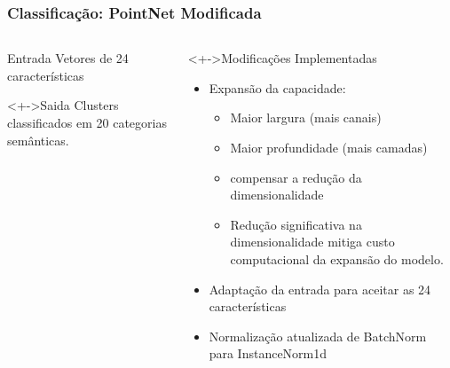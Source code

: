 \documentclass[aspectratio=169,t,xcolor=table]{beamer}
\begin{document}
\begin{frame}
    \frametitle{Classificação: PointNet Modificada}
    \begin{columns}[T]
        \begin{column}{.4\textwidth}
            \begin{block}{Entrada}
                \vspace{0.5em}
                Vetores de 24 características
                \vspace{0.5em}
            \end{block}
            \begin{block}<+->{Saida}
                \vspace{0.5em}
                Clusters classificados em 20 categorias semânticas.
                \vspace{0.5em}
            \end{block}
        \end{column}
        \begin{column}{.6\textwidth}
            \begin{block}<+->{Modificações Implementadas}
                \begin{itemize}[<+->]
                    \item Expansão da capacidade:
                          \begin{itemize}
                              \item Maior largura (mais canais)
                              \item Maior profundidade (mais camadas)
                              \item compensar a redução da dimensionalidade
                              \item Redução significativa na dimensionalidade
                                    mitiga custo computacional da expansão do
                                    modelo.
                          \end{itemize}
                    \item Adaptação da entrada para aceitar as 24 características
                    \item Normalização atualizada de BatchNorm para InstanceNorm1d
                \end{itemize}
            \end{block}
        \end{column}
    \end{columns}
\end{frame}
\end{document}
